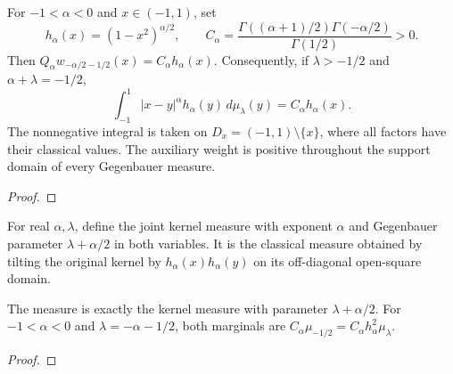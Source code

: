 \begin{supporting}
\begin{theorem}
\label{thm:power-law-critical-weight}
\leanok
For $-1<\alpha<0$ and $x\in(-1,1)$, set
\[
 h_\alpha(x)=(1-x^2)^{\alpha/2},\qquad
 C_\alpha=\frac{\Gamma((\alpha+1)/2)\Gamma(-\alpha/2)}{\Gamma(1/2)}>0.
\]
Then $Q_\alpha w_{-\alpha/2-1/2}(x)=C_\alpha h_\alpha(x)$.
Consequently, if $\lambda>-1/2$ and $\alpha+\lambda=-1/2$,
\[
 \int_{-1}^1 |x-y|^\alpha h_\alpha(y)\,d\mu_\lambda(y)
 = C_\alpha h_\alpha(x).
\]
The nonnegative integral is taken on $D_x=(-1,1)\setminus\{x\}$, where all factors have their classical values.
The auxiliary weight is positive throughout the support domain of every Gegenbauer measure.
\end{theorem}
\begin{proof}
\leanok
\end{proof}

\begin{definition}
\label{def:power-law-schur-measure}
\leanok
For real $\alpha,\lambda$, define the joint kernel measure with exponent
$\alpha$ and Gegenbauer parameter $\lambda+\alpha/2$ in both variables.
It is the classical measure obtained by tilting the original kernel by
$h_\alpha(x)h_\alpha(y)$ on its off-diagonal open-square domain.
\end{definition}
\begin{theorem}
\label{thm:power-law-schur-measure}
\leanok
The measure is exactly the kernel measure with parameter $\lambda+\alpha/2$.
For $-1<\alpha<0$ and $\lambda=-\alpha-1/2$, both marginals are
$C_\alpha\mu_{-1/2}=C_\alpha h_\alpha^2\mu_\lambda$.
\end{theorem}
\begin{proof}
\leanok
\end{proof}


\end{supporting}
